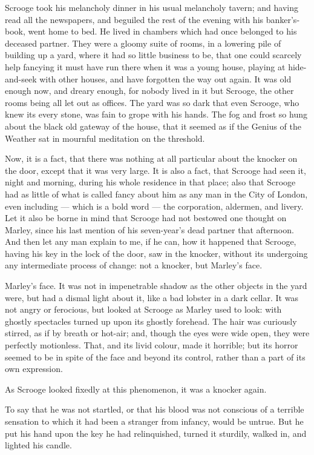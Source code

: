 \documentclass[11pt,twoside]{article}\makeatletter
\begin{document}
Scrooge took his melancholy dinner in his usual melancholy tavern; and having read all the newspapers, and beguiled the rest of the evening with his banker's-book, went home to bed.  He lived in chambers which had once belonged to his deceased partner.  They were a gloomy suite of rooms, in a lowering pile of building up a yard, where it had so little business to be, that one could scarcely help fancying it must have run there when it was a young house, playing at hide-and-seek with other houses, and have forgotten the way out again. It was old enough now, and dreary enough, for nobody lived in it but Scrooge, the other rooms being all let out as offices. The yard was so dark that even Scrooge, who knew its every stone, was fain to grope with his hands.  The fog and frost so hung about the black old gateway of the house, that it seemed as if the Genius of the Weather sat in mournful meditation on the threshold.  \par
Now, it is a fact, that there was nothing at all particular about the knocker on the door, except that it was very large. It is also a fact, that Scrooge had seen it, night and morning, during his whole residence in that place; also that Scrooge had as little of what is called fancy about him as any man in the City of London, even including — which is a bold word — the corporation, aldermen, and livery.  Let it also be borne in mind that Scrooge had not bestowed one thought on Marley, since his last mention of his seven-year's dead partner that afternoon.  And then let any man explain to me, if he can, how it happened that Scrooge, having his key in the lock of the door, saw in the knocker, without its undergoing any intermediate process of change:  not a knocker, but Marley's face.   \par
Marley's face.  It was not in impenetrable shadow as the other objects in the yard were, but had a dismal light about it, like a bad lobster in a dark cellar.  It was not angry or ferocious, but looked at Scrooge as Marley used to look: with ghostly spectacles turned up upon its ghostly forehead. The hair was curiously stirred, as if by breath or hot-air; and, though the eyes were wide open, they were perfectly motionless.  That, and its livid colour, made it horrible; but its horror seemed to be in spite of the face and beyond its control, rather than a part of its own expression.  \par
As Scrooge looked fixedly at this phenomenon, it was a knocker again.  \par
To say that he was not startled, or that his blood was not conscious of a terrible sensation to which it had been a stranger from infancy, would be untrue.  But he put his hand upon the key he had relinquished, turned it sturdily, walked in, and lighted his candle.  \par
\end{document}
